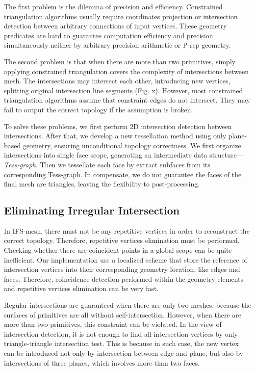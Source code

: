 \documentclass[10pt,journal,compsoc]{IEEEtran}
\begin{document}
The first problem is the dilemma of precision and efficiency. Constrained triangulation algorithms \cite{chew1989constrained,preparata2012computational} usually require coordinates projection or intersection detection between arbitrary connections of input vertices. These geometry predicates are hard to guarantee computation efficiency and precision simultaneously neither by arbitrary precision arithmetic or P-rep geometry.

The second problem is that when there are more than two primitives, simply applying constrained triangulation covers the complexity of intersections between mesh. The intersections may intersect each other, introducing new vertices, splitting original intersection line segments (Fig. x). However, most constrained triangulation algorithms assume that constraint edges do not intersect. They may fail to output the correct topology if the assumption is broken.

To solve these problems, we first perform 2D intersection detection between intersections. After that, we develop a new tessellation method using only plane-based geometry, ensuring unconditional topology correctness. We first organize intersections into single face scope, generating an intermediate data structure---\emph{Tess-graph}. Then we tessellate each face by extract subfaces from its corresponding Tess-graph. In compensate, we do not guarantee the faces of the final mesh are triangles, leaving the flexibility to post-processing.

\subsection{Eliminating Irregular Intersection}


In IFS-mesh, there must not be any repetitive vertices in order to reconstruct the correct topology. Therefore, repetitive vertices elimination must be performed. Checking whether there are coincident points in a global scope can be quite inefficient. Our implementation use a localized scheme that store the reference of intersection vertices into their corresponding geometry location, like edges and faces. Therefore, coincidence detection performed within the geometry elements and repetitive vertices elimination can be very fast.

Regular intersections are guaranteed when there are only two meshes, because the surfaces of primitives are all without self-intersection. However, when there are more than two primitives, this constraint can be violated. In the view of intersection detection, it is not enough to find all intersection vertices by only triangle-triangle intersection test. This is because in such case, the new vertex can be introduced not only by intersection between edge and plane, but also by intersections of three planes, which involves more than two faces.
\end{document}

